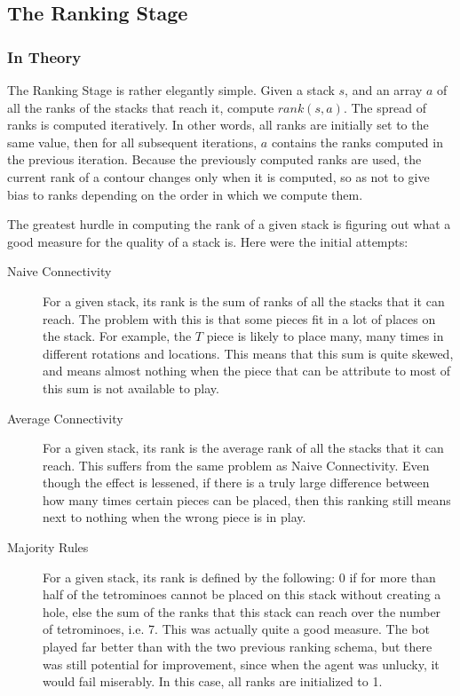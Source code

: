 \documentclass[fontsize=12pt]{article}
\begin{document}
\subsection{The Ranking Stage}
\label{sub:the_ranking_stage}
\subsubsection{In Theory}
\label{ssub:in_theory}
\par The Ranking Stage is rather elegantly simple. Given a stack $s$, and an array $a$ of all the ranks of the stacks that reach it, compute $rank(s,a)$. The spread of ranks is computed iteratively. In other words, all ranks are initially set to the same value, then for all subsequent iterations, $a$ contains the ranks computed in the previous iteration. Because the previously computed ranks are used, the current rank of a contour changes only when it is computed, so as not to give bias to ranks depending on the order in which we compute them.
\par The greatest hurdle in computing the rank of a given stack is figuring out what a good measure for the quality of a stack is. Here were the initial attempts:
\begin{description}
  \item[Naive Connectivity] For a given stack, its rank is the sum of ranks of all the stacks that it can reach. The problem with this is that some pieces fit in a lot of places on the stack. For example, the $T$ piece is likely to place many, many times in different rotations and locations. This means that this sum is quite skewed, and means almost nothing when the piece that can be attribute to most of this sum is not available to play.
  \item[Average Connectivity] For a given stack, its rank is the average rank of all the stacks that it can reach. This suffers from the same problem as Naive Connectivity. Even though the effect is lessened, if there is a truly large difference between how many times certain pieces can be placed, then this ranking still means next to nothing when the wrong piece is in play.
  \item[Majority Rules] For a given stack, its rank is defined by the following: 0 if for more than half of the tetrominoes cannot be placed on this stack without creating a hole, else the sum of the ranks that this stack can reach over the number of tetrominoes, i.e. 7. This was actually quite a good measure. The bot played far better than with the two previous ranking schema, but there was still potential for improvement, since when the agent was unlucky, it would fail miserably. In this case, all ranks are initialized to 1.
\end{description}
\end{document}
